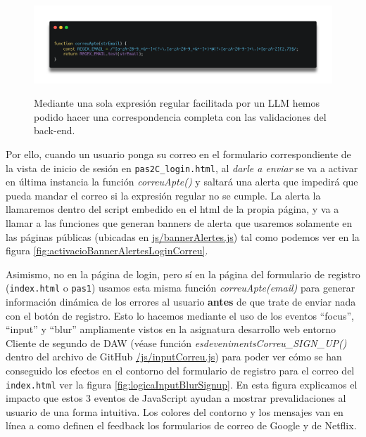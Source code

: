 \documentclass[a4paper,12pt]{report}
\begin{document}
		\FloatBarrier
		\setlength{\belowcaptionskip}{0pt}
		\begin{figure}[H]
			\centering
			\caption[Detalle de validación del correo (js/regexMail.js)]{Mediante una sola expresión regular facilitada por un LLM hemos podido hacer una correspondencia completa con las validaciones del back-end.}
			\includegraphics[width=1\linewidth]{img/regexMail}
			\label{fig:regexMail}
		\end{figure}
		\FloatBarrier
	
	
		Por ello, cuando un usuario ponga su correo en el formulario correspondiente de la vista de inicio de sesión en \texttt{pas2C\_login.html}, al \textit{darle a enviar} se va a activar en última instancia la función \textit{correuApte()} y saltará una alerta que impedirá que pueda mandar el correo si la expresión regular no se cumple. La alerta la llamaremos dentro del script embedido en el html de la propia página, y va a llamar a las funciones que generan banners de alerta que usaremos solamente en las páginas públicas (ubicadas en \href{https://github.com/blackcub3s/mercApp/blob/main/APP%20WEB/__frontend__produccio__/app/js/bannerAlertes.js}{js/bannerAlertes.js}) tal como podemos ver en la figura \ref{fig:activacioBannerAlertesLoginCorreu}.
		
		Asimismo, no en la página de login, pero sí en la página del formulario de registro (\texttt{index.html} o \texttt{pas1}) usamos esta misma función \textit{correuApte(email)} para generar información dinámica de los errores al usuario \textbf{antes} de que trate de enviar nada con el botón de registro. Esto lo hacemos mediante el uso de los eventos ``focus'', ``input'' y ``blur'' ampliamente vistos en la asignatura desarrollo web entorno Cliente de segundo de DAW (véase función \textit{esdevenimentsCorreu\_SIGN\_UP()} dentro del archivo de GitHub \href{https://github.com/blackcub3s/mercApp/blob/main/APP%20WEB/__frontend__produccio__/app/js/inputCorreu.js}{/js/inputCorreu.js}) para poder ver cómo se han conseguido los efectos en el contorno del formulario de registro para el correo del \texttt{index.html} ver la figura \ref{fig:logicaInputBlurSignup}. En esta figura explicamos el impacto que estos 3 eventos de JavaScript ayudan a mostrar prevalidaciones al usuario de una forma intuitiva. Los colores del contorno y los mensajes van en línea a como definen el feedback los formularios de correo de Google y de Netflix.
		
\end{document}
